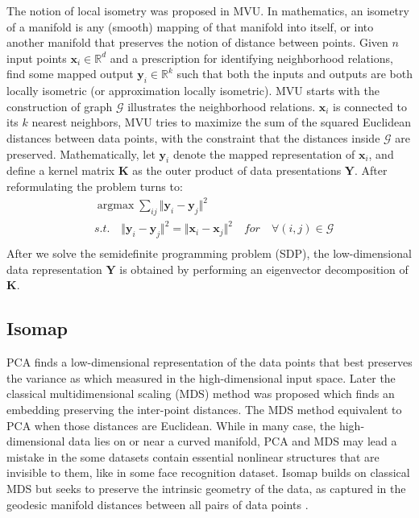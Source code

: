 \documentclass[journal]{IEEEtran}
\DeclareMathOperator*{\argmax}{argmax}
\begin{document}
The notion of local isometry was proposed in MVU.
In mathematics, an isometry of a manifold is any (smooth) mapping of that manifold into itself, or into another manifold that preserves the notion of distance between points. 
Given $n$ input points $\bm{x}_i \in \mathbb{R}^d$ and a prescription for identifying neighborhood relations,  find some mapped output  $\bm{y}_i \in \mathbb{R}^k$ such that both the inputs and outputs are both locally isometric (or approximation locally isometric).
MVU starts with the construction of graph $\mathcal{G}$ illustrates the neighborhood relations. $\bm{x}_i$ is connected to its $k$ nearest neighbors, MVU tries to maximize the sum of the squared Euclidean distances between data points, with the constraint that the distances inside $\mathcal{G}$ are preserved.
Mathematically, let $\bm{y}_i$ denote the mapped representation of $\bm{x}_i$, and define a kernel matrix $\bm{K}$ as the outer product of data presentations $\bm{Y}$. After reformulating the problem turns to:
\begin{equation}
\begin{split}
& \argmax \sum_{ij}\Vert \bm{y}_i - \bm{y}_j \Vert^2  \\
& s.t. \quad  \Vert \bm{y}_i - \bm{y}_j \Vert^2 = \Vert \bm{x}_i - \bm{x}_j \Vert^2 \quad for \quad \forall (i, j) \in \mathcal{G} \\
\end{split}
\end{equation}
After we solve the semidefinite programming problem (SDP), the low-dimensional data representation $\bm{Y}$ is obtained by performing an eigenvector decomposition of $\bm{K}$.




%
%

\subsection{Isomap}
PCA finds a low-dimensional representation of the data points that best preserves the variance as which measured in the high-dimensional input space.
Later the classical multidimensional scaling (MDS) method was proposed which finds an embedding preserving the inter-point distances\cite{Kruskal1978Multidimensional}. 
The MDS method equivalent to PCA when those distances are Euclidean.
While in many case, the high-dimensional data lies on or near a curved manifold, PCA and MDS may lead a mistake in the some datasets contain essential nonlinear structures that are invisible to them, like in some face recognition dataset.
Isomap builds on classical MDS but seeks to preserve the intrinsic geometry of the data, as captured in the geodesic manifold distances between all pairs of data points \cite{tenenbaum2000isomap}. 
\end{document}

